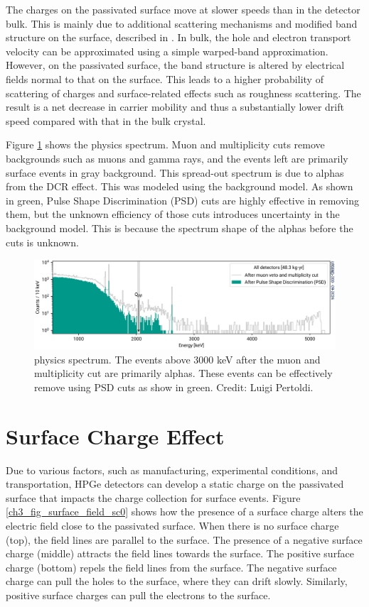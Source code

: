 The charges on the passivated surface move at slower speeds than in the detector bulk. This is mainly due to additional scattering mechanisms and modified band structure on the surface, described in \cite{MULLOWNEY201233}. In bulk, the hole and electron transport velocity can be approximated using a simple warped-band approximation. However, on the passivated surface, the band structure is altered by electrical fields normal to that on the surface. This leads to a higher probability of scattering of charges and surface-related effects such as roughness scattering. The result is a net decrease in carrier mobility and thus a substantially lower drift speed compared with that in the bulk crystal.

Figure \ref{ch3_fig_L200_surface_background} shows the {\Ltwo} physics spectrum. Muon and multiplicity cuts remove backgrounds such as muons and gamma rays, and the events left are primarily surface events in gray background. This spread-out spectrum is due to alphas from the DCR effect. This was modeled using the {\Gerda} background model. As shown in green, Pulse Shape Discrimination (PSD) cuts are highly effective in removing them, but the unknown efficiency of those cuts introduces uncertainty in the background model. This is because the spectrum shape of the alphas before the cuts is unknown.

\begin{figure}[!htb]
\centering
  \includegraphics[width=0.99\linewidth]{ch3/figs/l200-phy-spectrum-psd.png}
  \caption{{\Ltwo} physics spectrum. The events above 3000 keV after the muon and multiplicity cut are primarily alphas. These events can be effectively remove using PSD cuts as show in green. Credit: Luigi Pertoldi.}
\label{ch3_fig_L200_surface_background}
\end{figure}

\section{Surface Charge Effect}
Due to various factors, such as manufacturing, experimental conditions, and transportation, HPGe detectors can develop a static charge on the passivated surface that impacts the charge collection for surface events. Figure \ref{ch3_fig_surface_field_sc0} shows how the presence of a surface charge alters the electric field close to the passivated surface. When there is no surface charge (top), the field lines are parallel to the surface. The presence of a negative surface charge (middle) attracts the field lines towards the surface. The positive surface charge (bottom) repels the field lines from the surface. The negative surface charge can pull the holes to the surface, where they can drift slowly. Similarly, positive surface charges can pull the electrons to the surface.


